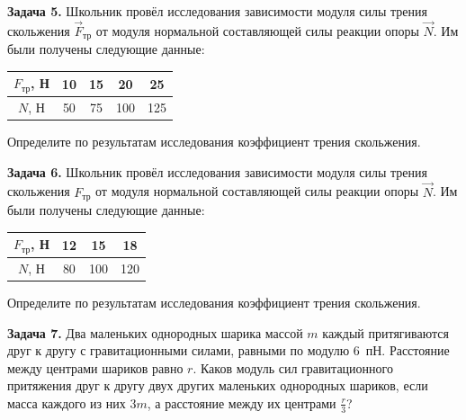 \begin{taskbasic}[code={\label{task:dem26_v5_n2}}]
\textbf{Задача 5.} Школьник провёл исследования зависимости модуля силы трения скольжения $\vec{F}_{\text{тр}}$ от модуля нормальной составляющей силы реакции опоры $\vec{N}$. Им были получены следующие данные:
\begin{center}
\begin{tabular}{|c|c|c|c|c|}
\hline
$F_{\text{тр}}$, Н & 10 & 15 & 20 & 25 \\ \hline
$N$, Н & 50 & 75 & 100 & 125 \\ \hline
\end{tabular}
\end{center}
Определите по результатам исследования коэффициент трения скольжения.

\end{taskbasic}

\begin{taskbasic}[code={\label{task:dem26_v6_n2}}]
\textbf{Задача 6.} Школьник провёл исследования зависимости модуля силы трения скольжения $F_{\text{тр}}$ от модуля нормальной составляющей силы реакции опоры $\vec{N}$. Им были получены следующие данные:
\begin{center}
\begin{tabular}{|c|c|c|c|}
\hline
$F_{\text{тр}}$, Н & 12 & 15 & 18 \\ \hline
$N$, Н & 80 & 100 & 120 \\ \hline
\end{tabular}
\end{center}
Определите по результатам исследования коэффициент трения скольжения.

\end{taskbasic}

\begin{taskbasic}[code={\label{task:dem26_v7_n2}}]
\textbf{Задача 7.} Два маленьких однородных шарика массой $m$ каждый притягиваются друг к другу с гравитационными силами, равными по модулю $6$~пН. Расстояние между центрами шариков равно $r$. Каков модуль сил гравитационного притяжения друг к другу двух других маленьких однородных шариков, если масса каждого из них $3m$, а расстояние между их центрами $\frac{r}{3}$?

\end{taskbasic}

